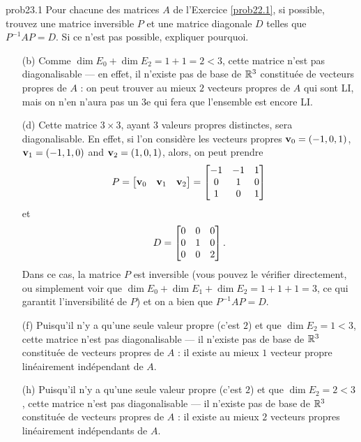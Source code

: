 
\begin{sol}{prob23.1} Pour chacune des matrices $A$ de l'Exercice \ref{prob22.1}, si possible, trouvez une matrice inversible $P$ et une matrice diagonale $D$ telles que $P^{-1}AP =D$. Si ce n'est pas possible, expliquer pourquoi.

\soln
\begin{enumerate}[]
\medskip
\item[(b) ]Comme $\dim E_0 +\dim E_2=1+1=2<3$, cette matrice n'est pas diagonalisable --- en effet, il n'existe pas de base de $\mathbb{R}^3$ constituée de vecteurs propres de $A$ : on peut trouver au mieux $2$ vecteurs propres de $A$ qui sont LI, mais on n'en n'aura pas un 3e qui fera que l'ensemble est encore LI. 
\medskip

\item[(d)] Cette matrice $ 3\times 3$, ayant 3 valeurs propres distinctes, sera diagonalisable. En effet, si l'on considère les vecteurs propres $\mathbf{v}_0=(-1,0,1)$, $\mathbf{v}_1=(-1,1,0)$ and $\mathbf{v}_2=(1,0,1)$, alors, on peut prendre $$P=\bmatrix \vv_0&\vv_1& \vv_2\endbmatrix = \bmatrix 
-1&-1&1\\
0&1&0\\
1&0&1\endbmatrix $$ et $$D= \bmatrix 
0&0&0\\
0&1&0\\
0&0&2\endbmatrix.$$ 
Dans ce cas, la matrice $P$ est inversible (vous pouvez le vérifier directement, ou simplement voir que $\dim E_0+\dim E_1 +\dim E_2 =1+1+1=3$, ce qui garantit l'inversibilité de $P$) et on a bien que $P^{-1}AP =D$. \medskip

\item[(f)] Puisqu'il n'y a qu'une seule valeur propre (c'est $2$) et que $\dim E_2=1<3$, cette matrice n'est pas diagonalisable --- il n'existe pas de base de $\mathbb{R}^3$ constituée de vecteurs propres de $A$ : il existe au mieux $1$ vecteur propre linéairement indépendant de $A$. 
\medskip

\item[(h)] Puisqu'il n'y a qu'une seule valeur propre (c'est $2$) et que $\dim E_2=2<3$,  cette matrice n'est pas diagonalisable --- il n'existe pas de base de $\mathbb{R}^3$ constituée de vecteurs propres de $A$ : il existe au mieux $2$ vecteurs propres linéairement indépendants de $A$. 
\medskip


\end{enumerate}


\bigskip
\end{sol}

